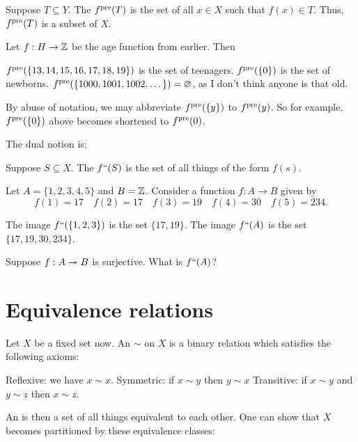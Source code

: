 \begin{definition}
	Suppose $T \subseteq Y$.
	The  $f^{\text{pre}}(T)$ is the set of all
	$x \in X$ such that $f(x) \in T$.
	Thus, $f^{\text{pre}}(T)$ is a subset of $X$.
\end{definition}
\begin{example}
	Let $f : H \to \mathbb Z$ be the age function from earlier.
	Then
	\begin{enumerate}[(a)]
		\ii $f^{\text{pre}}(\{13, 14, 15, 16, 17, 18, 19\})$ is the set of teenagers.
		\ii $f^{\text{pre}}(\{0\})$ is the set of newborns.
		\ii $f^{\text{pre}}(\{1000, 1001, 1002, \dots \}) = \varnothing$,
		as I don't think anyone is that old.
	\end{enumerate}
\end{example}

\begin{abuse}
	By abuse of notation, we may abbreviate $f^{\text{pre}}(\{y\})$ to $f^{\text{pre}}(y)$.
	So for example, $f^{\text{pre}}(\{0\})$ above becomes shortened to $f^{\text{pre}}(0)$.
\end{abuse}

The dual notion is:
\begin{definition}
	Suppose $S \subseteq X$.
	The  $f``(S)$ is the set of all things of the form $f(s)$.
\end{definition}
\begin{example}
	Let $A = \{1,2,3,4,5\}$ and $B = \mathbb Z$.
	Consider a function $f : A \to B$ given by
	\[
		f(1) = 17 \quad
		f(2) = 17 \quad
		f(3) = 19 \quad
		f(4) = 30 \quad
		f(5) = 234.
	\]
	\begin{enumerate}[(a)]
		\ii The image $f``(\{1,2,3\})$ is the set $\{17, 19\}$.
		\ii The image $f``(A)$ is the set $\{17, 19, 30, 234\}$.
	\end{enumerate}
\end{example}
\begin{ques}
	Suppose $f : A \twoheadrightarrow B$ is surjective.
	What is $f``(A)$?
\end{ques}

\section{Equivalence relations}
Let $X$ be a fixed set now.
An  $\sim$ on $X$ is a binary relation
which satisfies the following axioms:
\begin{itemize}
	\ii Reflexive: we have $x \sim x$.
	\ii Symmetric: if $x \sim y$ then $y \sim x$
	\ii Transitive: if $x \sim y$ and $y \sim z$ then $x \sim z$.
\end{itemize}
An  is then a
set of all things equivalent to each other.
One can show that $X$ becomes partitioned by these equivalence classes:

